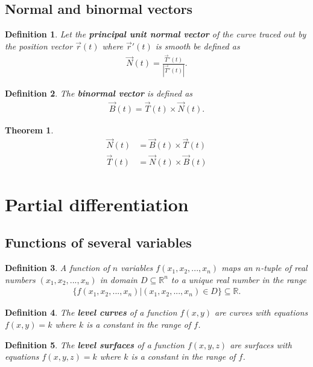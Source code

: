 \documentclass{article}
\theoremstyle{sltheorem}
\newtheorem{definition}{Definition}[section]
\newtheorem{theorem}{Theorem}[section]
\newcommand{\R}{\mathbb{R}}
\newcommand*\B[1]{\textbf{#1}}
\begin{document}
\subsection{Normal and binormal vectors}
\begin{definition}
    Let the \B{principal unit normal vector} of the curve traced out by the position vector $\vec r(t)$
    where $\vec r'(t)$ is smooth be defined as
    \begin{align*}
        \vec N (t) = \frac{\vec T'(t)}{\left| \vec T'(t) \right|}.
    \end{align*}
\end{definition}
\begin{definition}
    The \B{binormal vector} is defined as
    \begin{align*}
        \vec B(t) = \vec T(t) \times \vec N(t).
    \end{align*}
\end{definition}
\begin{theorem}
    \begin{align*}
        \vec N(t) &= \vec B(t) \times \vec T(t)\\
        \vec T(t) &= \vec N(t) \times \vec B(t)
    \end{align*}
\end{theorem}
\section{Partial differentiation}
\subsection{Functions of several variables}
\begin{definition}
    A function of $n$ variables $f(x_1, x_2, ..., x_n)$ maps an $n$-tuple
    of real numbers $(x_1, x_2, ..., x_n)$ in domain $D\subseteq\R^n$ to
    a unique real number in the range
    \begin{align*}
        \{f(x_1, x_2, ..., x_n)|(x_1, x_2, ..., x_n)\in D\} \subseteq \R.
    \end{align*}
\end{definition}
\begin{definition}
    The \B{level curves} of a function $f(x,y)$ are curves with equations
    $f(x,y)=k$ where $k$ is a constant in the range of $f$.
\end{definition}
\begin{definition}
    The \B{level surfaces} of a function $f(x,y,z)$ are surfaces with
    equations $f(x,y,z)=k$ where $k$ is a constant in the range of $f$.
\end{definition}
\end{document}

